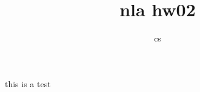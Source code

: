 \documentclass[10pt]{article}
\title{nla hw02}
\author{cs}
\begin{document}
\maketitle

this is a test
\end{document}
